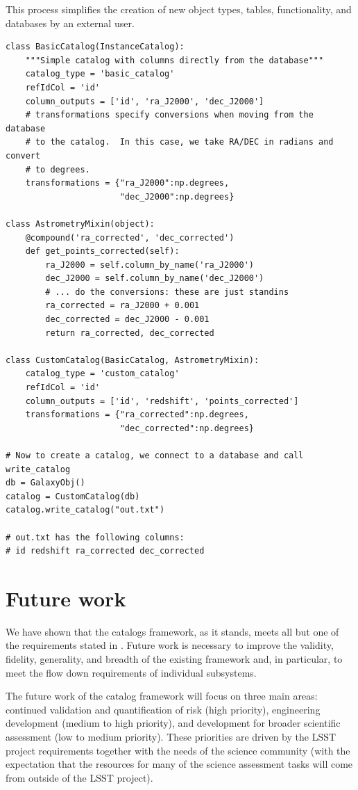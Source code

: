 \documentclass[11pt]{article}
\begin{document}
This process simplifies the creation of new object types, tables,
functionality, and databases by an external user. 

\begin{verbatim}
class BasicCatalog(InstanceCatalog):
    """Simple catalog with columns directly from the database"""
    catalog_type = 'basic_catalog'
    refIdCol = 'id'
    column_outputs = ['id', 'ra_J2000', 'dec_J2000']
    # transformations specify conversions when moving from the database
    # to the catalog.  In this case, we take RA/DEC in radians and convert
    # to degrees.
    transformations = {"ra_J2000":np.degrees,
                       "dec_J2000":np.degrees}

class AstrometryMixin(object):
    @compound('ra_corrected', 'dec_corrected')
    def get_points_corrected(self):
        ra_J2000 = self.column_by_name('ra_J2000')
        dec_J2000 = self.column_by_name('dec_J2000')
        # ... do the conversions: these are just standins
        ra_corrected = ra_J2000 + 0.001
        dec_corrected = dec_J2000 - 0.001
        return ra_corrected, dec_corrected

class CustomCatalog(BasicCatalog, AstrometryMixin):
    catalog_type = 'custom_catalog'
    refIdCol = 'id'
    column_outputs = ['id', 'redshift', 'points_corrected']
    transformations = {"ra_corrected":np.degrees,
                       "dec_corrected":np.degrees}

# Now to create a catalog, we connect to a database and call write_catalog
db = GalaxyObj()
catalog = CustomCatalog(db)
catalog.write_catalog("out.txt")

# out.txt has the following columns:
# id redshift ra_corrected dec_corrected
\end{verbatim}


\section{Future work}
We have shown that the catalogs framework, as it stands, meets all but
one of the requirements stated in \citet{requirements}.  Future work
is necessary to improve the validity, fidelity, generality, and
breadth of the existing framework and, in particular, to meet the
flow down requirements of individual subsystems.

The future work of the catalog framework will focus on three main
areas: continued validation and quantification of risk (high
priority), engineering development (medium to high priority), and
development for broader scientific assessment (low to medium
priority). These priorities are driven by the LSST project requirements
together with the needs of the science community (with the expectation
that the resources for many of the science assessment tasks will come
from outside of the LSST project).
\end{document}

